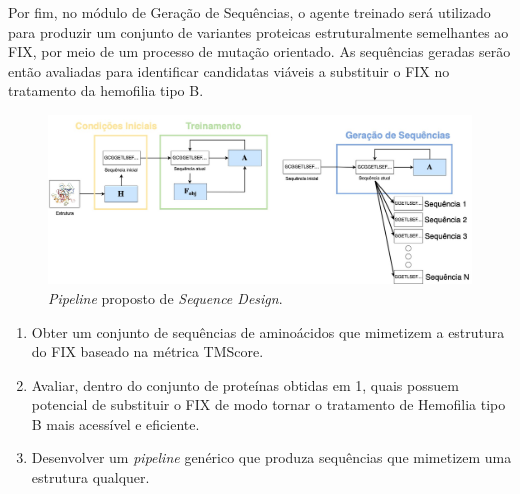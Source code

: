 Por fim, no módulo de Geração de Sequências, 
o agente treinado será utilizado para produzir um conjunto de variantes proteicas estruturalmente semelhantes ao FIX,
por meio de um processo de mutação orientado. 
As sequências geradas serão então avaliadas para identificar candidatas viáveis 
a substituir o FIX no tratamento da hemofilia tipo B.

\begin{figure}[H]
  \centering
  \includegraphics[width=.8\textwidth]{figuras/metodologia-pipeline_proposta.jpg}
  \caption{\textit{Pipeline} proposto de \textit{Sequence Design}.}
  \label{fig:proposta}
\end{figure}


\begin{enumerate}
  \item Obter um conjunto de sequências de aminoácidos que mimetizem a estrutura do FIX baseado na métrica TMScore.
  \item Avaliar, dentro do conjunto de proteínas obtidas em 1, quais possuem potencial de substituir o FIX de modo tornar o tratamento de Hemofilia tipo B mais acessível e eficiente.
  \item Desenvolver um \textit{pipeline} genérico que produza sequências que mimetizem uma estrutura qualquer.
\end{enumerate}

